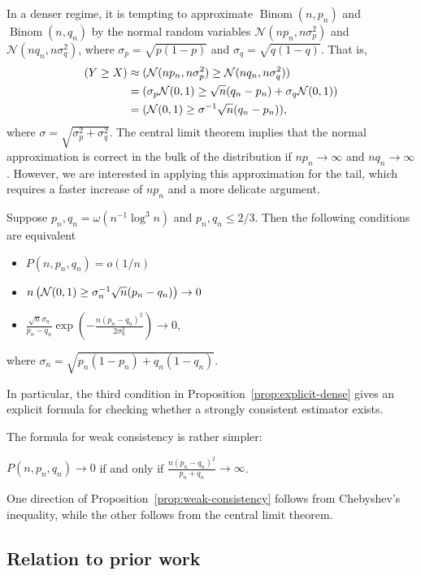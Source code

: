 \documentclass[EJP,final]{ejpecp}
\newcommand{\1}[1]{\mathbbm{1}_{\{#1\}}}
\newcommand{\normal}{\mathcal{N}}
\let\Pr\relax
\DeclareMathOperator{\Pr}{Pr}
\DeclareMathOperator{\Binom}{Binom}
\begin{document}
In a denser regime, it is tempting to approximate $\Binom(n,p_n)$ and $\Binom(n,q_n)$ by the normal random variables
$\normal(n p_n, n \sigma_p^2)$ and $\normal(n q_n, n \sigma_q^2)$, where
$\sigma_p = \sqrt{p(1-p)}$ and $\sigma_q = \sqrt{q(1-q)}$. That is,
\begin{align*}
\Pr(Y \geq X) &\approx \Pr(\normal(n p_n, n \sigma_p^2) \geq \normal(n q_n, n \sigma_q^2)) \\
&= \Pr(\sigma_p \normal(0,1) \geq \sqrt{n}(q_n - p_n) + \sigma_q \normal(0,1)) \\ &=
\Pr(\normal(0,1) \geq \sigma^{-1} \sqrt{n}(q_n - p_n)),
\end{align*}
where $\sigma = \sqrt{\sigma_p^2 + \sigma_q^2}$. The central limit theorem implies that
the normal approximation is correct in the bulk of the distribution if $np_n \to \infty$ and
$n q_n \to \infty$. However, we are interested in applying this approximation for the tail,
which requires a faster increase of $n p_n$ and a more delicate argument.

\begin{proposition}\label{prop:explicit-dense}
Suppose
$
p_n,q_n = \omega\left( n^{-1} \log^3 n \right)$
and $p_n, q_n \leq 2/3.$
Then the following conditions are equivalent
\begin{itemize}
\item
$P(n, p_n, q_n) = o(1/n)$
\item
$n \Pr\left(\normal(0,1) \geq \sigma_n^{-1} \sqrt{n}(p_n - q_n)\right) \to 0$
\item
$\frac{\sqrt{n} \sigma_n}{p_n-q_n} \exp(-\frac{n (p_n - q_n)^2}{2 \sigma_n^2}) \to 0$,
\end{itemize}
where $\sigma_n = \sqrt{p_n(1-p_n) + q_n(1-q_n)}$.
\end{proposition}
In particular, the third condition in Proposition~\ref{prop:explicit-dense} 
gives an explicit formula for checking whether a strongly consistent estimator
exists.

The formula for weak consistency is rather simpler:
\begin{proposition}\label{prop:weak-consistency}
 $P(n, p_n, q_n) \to 0$ if and only if
 $\frac{n(p_n - q_n)^2}{p_n + q_n} \to \infty$.
\end{proposition}
One direction of Proposition~\ref{prop:weak-consistency} follows from Chebyshev's inequality,
while the other follows from the central limit theorem.

\subsection{Relation to prior work}
\end{document}

